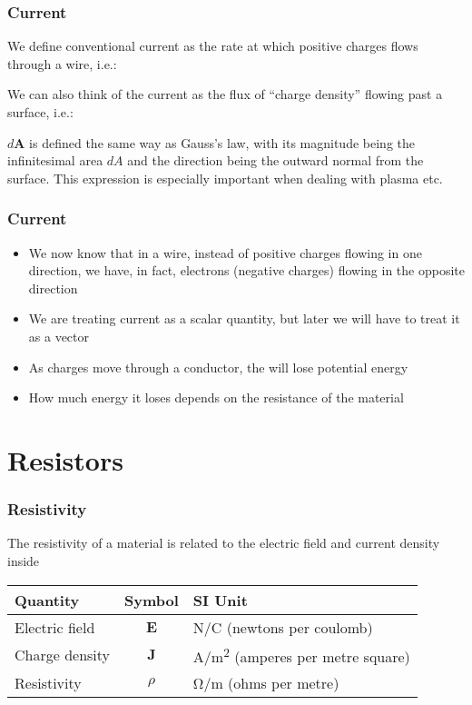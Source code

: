 \documentclass[12pt,aspectratio=169]{beamer}
\newcommand{\mb}[1]{\mathbf{#1}}
\newcommand{\eq}[2]{\vspace{#1}{\Large\begin{displaymath}#2\end{displaymath}}}
\begin{document}
\begin{frame}
  \frametitle{Current}
  We define conventional current as the rate at which positive charges flows
  through a wire, i.e.:

  \eq{-.3in}{\boxed{I=\frac{dQ}{dt}}}

  We can also think of the current as the flux of ``charge density'' flowing
  past a surface, i.e.:
  
  \eq{-.3in}{\boxed{I=\int\mb{J}\cdot d\mb{A}}}

  $d\mb{A}$ is defined the same way as Gauss's law, with its
  magnitude being the infinitesimal area $dA$ and the direction being the
  outward normal from the surface. This expression is especially important when
  dealing with plasma etc.
\end{frame}


\begin{frame}
  \frametitle{Current}
  \begin{itemize}
  \item We now know that in a wire, instead of positive charges flowing in one
    direction, we have, in fact, electrons (negative charges) flowing in the
    opposite direction
  \item We are treating current as a scalar quantity, but later we will have to
    treat it as a vector
  \item As charges move through a conductor, the will lose potential energy
  \item How much energy it loses depends on the resistance of the material
  \end{itemize}
\end{frame}


\section{Resistors}


\begin{frame}
  \frametitle{Resistivity}
  The resistivity of a material is related to the electric field and current
  density inside

  \eq{-.3in}{
    \boxed{\mb{E}=\rho\mb{J}}
    \quad\quad\text{\large in scalar:}\;
    \boxed{\rho=\left|\frac{E}{J}\right|}
  }

  \begin{center}
    \begin{tabular}{l|c|l}
      \rowcolor{pink}
      \textbf{Quantity} & \textbf{Symbol} & \textbf{SI Unit} \\ \hline
      Electric field & $\mb{E}$ & \si{\newton/\coulomb} (newtons per coulomb) \\
      Charge density & $\mb{J}$ & \si{\ampere/m^2} (amperes per metre square) \\
      Resistivity & $\rho$ & \si{\ohm/\metre} (ohms per metre)
    \end{tabular}
  \end{center}
\end{frame}
\end{document}
